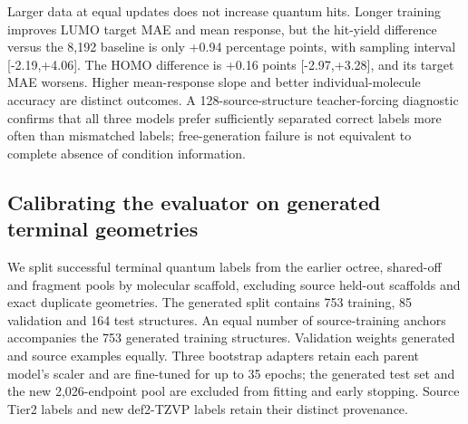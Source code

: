 \documentclass[11pt,a4paper]{article}
\begin{document}
Larger data at equal updates does not increase quantum hits. Longer
training improves LUMO target MAE and mean response, but the hit-yield
difference versus the 8,192 baseline is only +0.94 percentage points,
with sampling interval {[}-2.19,+4.06{]}. The HOMO difference is +0.16
points {[}-2.97,+3.28{]}, and its target MAE worsens. Higher
mean-response slope and better individual-molecule accuracy are distinct
outcomes. A 128-source-structure teacher-forcing diagnostic confirms
that all three models prefer sufficiently separated correct labels more
often than mismatched labels; free-generation failure is not equivalent
to complete absence of condition information.

\FloatBarrier
\subsection{Calibrating the evaluator on generated terminal
geometries}\label{calibrating-the-evaluator-on-generated-terminal-geometries}

We split successful terminal quantum labels from the earlier octree,
shared-off and fragment pools by molecular scaffold, excluding source
held-out scaffolds and exact duplicate geometries. The generated split
contains 753 training, 85 validation and 164 test structures. An equal
number of source-training anchors accompanies the 753 generated training
structures. Validation weights generated and source examples equally.
Three bootstrap adapters retain each parent model's scaler and are
fine-tuned for up to 35 epochs; the generated test set and the new
2,026-endpoint pool are excluded from fitting and early stopping. Source
Tier2 labels and new def2-TZVP labels retain their distinct provenance.
\end{document}
